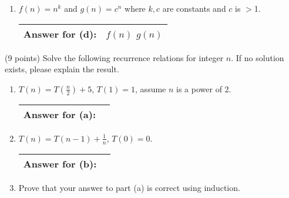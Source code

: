 \documentclass[11pt]{article}
\begin{document}
\begin{problems}
\begin{enumerate}
\item $f(n) = n^k$ and $g( n)=c^n$ where $k,c$ are constants and $c$ is $>$1.
\vspace{.25in}
\begin{table}[!h]  \flushright \renewcommand{\arraystretch}{2}  \begin{tabular}{|l|c| } \hline
Answer for (d): &  \hspace{.15in} $f(n)$ \hspace{.5in} $g(n)$ \hspace{.15in}\\
\hline \end{tabular} \end{table}

\end{enumerate}
 \item (9 points) Solve the following recurrence relations for integer $n$. If
no solution exists, please explain the result.
\begin{enumerate}
\item $T(n)=T(\frac{n}{2}) + 5$, $T(1) = 1$, assume $n$ is a power of 2.
\vspace{1.5in}
\begin{table}[!h]  \flushright \renewcommand{\arraystretch}{2}  \begin{tabular}{|l|c| } \hline
Answer for (a): & \hspace{2in} \\
\hline \end{tabular} \end{table}

\item $T(n)= T(n-1) + \frac{1}{n}$, $T(0) = 0$.
\vspace{1.5in}
\begin{table}[!h]  \flushright \renewcommand{\arraystretch}{2}  \begin{tabular}{|l|c| } \hline
Answer for (b): & \hspace{2in} \\
\hline \end{tabular} \end{table}

\item Prove that your answer to part (a) is correct using induction.
\vspace{1.5in}

\end{enumerate}


\end{problems}
\end{document}
